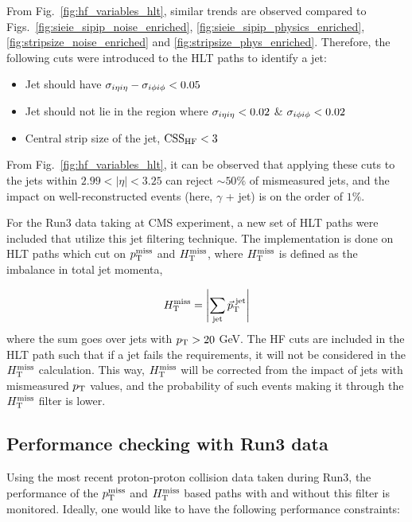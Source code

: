 From Fig.~\ref{fig:hf_variables_hlt}, similar trends are observed compared to Figs.~\ref{fig:sieie_sipip_noise_enriched}, \ref{fig:sieie_sipip_physics_enriched}, 
\ref{fig:stripsize_noise_enriched} and \ref{fig:stripsize_phys_enriched}. Therefore, the following cuts were introduced to the HLT paths to identify a jet:

\begin{itemize}
    \item Jet should have $\sigma_{i\eta i\eta} - \sigma_{i\phi i\phi} < 0.05$
    \item Jet should not lie in the region where $\sigma_{i\eta i\eta} < 0.02$ \& $\sigma_{i\phi i\phi} < 0.02$
    \item Central strip size of the jet, $\mathrm{CSS_{HF}} < 3$
\end{itemize}

From Fig.~\ref{fig:hf_variables_hlt}, it can be observed that applying these cuts to the jets within $2.99 < |\eta| < 3.25$ can reject $\sim 50\%$ of mismeasured
jets, and the impact on well-reconstructed events (here, $\gamma$ + jet) is on the order of $1\%$. 

For the Run3 data taking at CMS experiment, a new set of HLT paths were included that utilize this jet filtering technique. The implementation is
done on HLT paths which cut on $p_{\textrm{T}}^{\textrm{miss}}$ and $H_{\mathrm{T}}^{\mathrm{miss}}$, where $H_{\mathrm{T}}^{\mathrm{miss}}$ is defined as the imbalance in total jet momenta,

\begin{equation}
    H_{\mathrm{T}}^{\mathrm{miss}} = \left| \sum_{\mathrm{jet}} {\vec p}_{\mathrm{T}}^{\;\text{jet}} \right|
    \label{eq:htmiss_def}
\end{equation}
where the sum goes over jets with $p_{\textrm{T}} > 20$ GeV. The HF cuts are included in the HLT path such that if a jet fails the requirements, it will not be considered
in the $H_{\mathrm{T}}^{\mathrm{miss}}$ calculation. This way, $H_{\mathrm{T}}^{\mathrm{miss}}$ will be corrected from the impact of jets with mismeasured $p_{\textrm{T}}$ values, and the probability of such events
making it through the $H_{\mathrm{T}}^{\mathrm{miss}}$ filter is lower.

\subsection{Performance checking with Run3 data}
\label{subsec:trig_perf_check_run3}

Using the most recent proton-proton collision data taken during Run3, the performance of the $p_{\textrm{T}}^{\textrm{miss}}$ and $H_{\mathrm{T}}^{\mathrm{miss}}$ based paths with and without this filter is
monitored. Ideally, one would like to have the following performance constraints:

